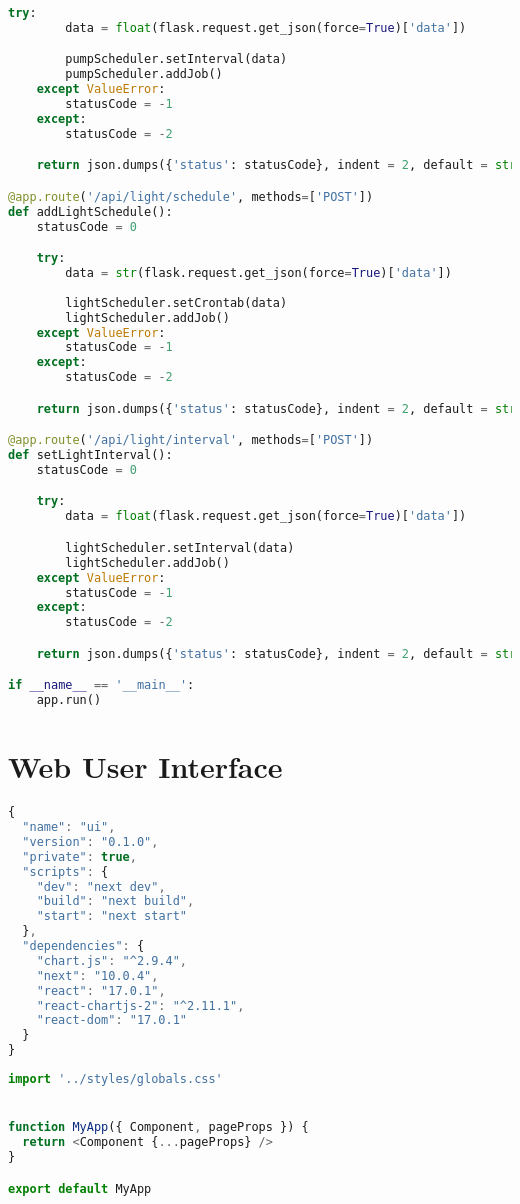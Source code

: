 \documentclass[a4paper,12pt,twoside,openright,titlepage]{book}
\begin{document}
\begin{lstlisting}[title={raspberrypi/api/data.py}, language=Python]
    try:
        data = float(flask.request.get_json(force=True)['data'])

        pumpScheduler.setInterval(data)
        pumpScheduler.addJob()
    except ValueError:
        statusCode = -1
    except:
        statusCode = -2

    return json.dumps({'status': statusCode}, indent = 2, default = str)

@app.route('/api/light/schedule', methods=['POST'])
def addLightSchedule():
    statusCode = 0

    try:
        data = str(flask.request.get_json(force=True)['data'])
        
        lightScheduler.setCrontab(data)
        lightScheduler.addJob()
    except ValueError:
        statusCode = -1
    except:
        statusCode = -2

    return json.dumps({'status': statusCode}, indent = 2, default = str)

@app.route('/api/light/interval', methods=['POST'])
def setLightInterval():
    statusCode = 0

    try:
        data = float(flask.request.get_json(force=True)['data'])

        lightScheduler.setInterval(data)
        lightScheduler.addJob()
    except ValueError:
        statusCode = -1
    except:
        statusCode = -2

    return json.dumps({'status': statusCode}, indent = 2, default = str)

if __name__ == '__main__':
    app.run()
\end{lstlisting}

\section{Web User Interface}
\begin{lstlisting}[title={raspberrypi/ui/package.json}, language=JavaScript]
{
  "name": "ui",
  "version": "0.1.0",
  "private": true,
  "scripts": {
    "dev": "next dev",
    "build": "next build",
    "start": "next start"
  },
  "dependencies": {
    "chart.js": "^2.9.4",
    "next": "10.0.4",
    "react": "17.0.1",
    "react-chartjs-2": "^2.11.1",
    "react-dom": "17.0.1"
  }
}
\end{lstlisting}

\bigskip

\begin{lstlisting}[title={raspberrypi/ui/pages/\_app.js}, language=JavaScript]
import '../styles/globals.css'


function MyApp({ Component, pageProps }) {
  return <Component {...pageProps} />
}

export default MyApp
\end{lstlisting}
\end{document}
